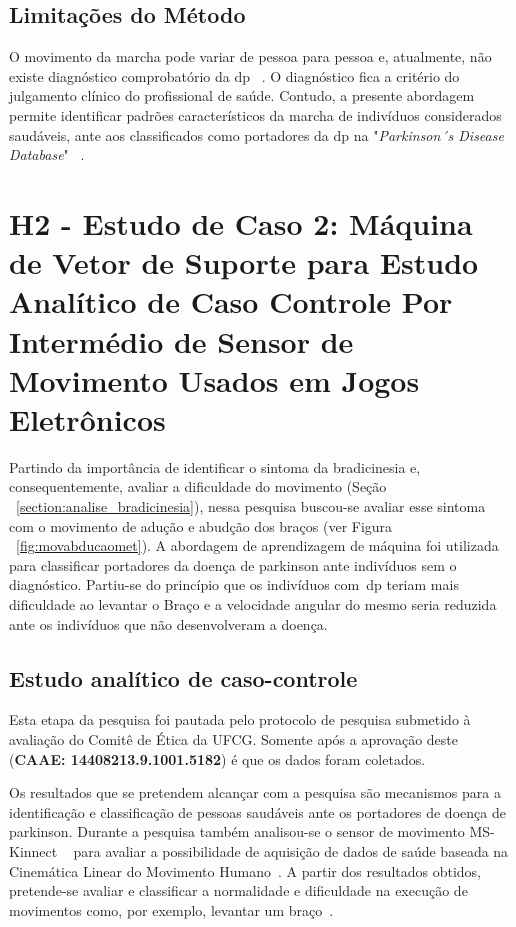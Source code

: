 \subsection{Limitações do Método}
O movimento da marcha pode variar de pessoa para pessoa e, atualmente, não existe diagnóstico comprobatório da \ac{dp} ~\cite{visionbased2009,protpar010}. O diagnóstico fica a critério do julgamento clínico do profissional de saúde. Contudo, a presente abordagem permite identificar padrões característicos da marcha de indivíduos considerados saudáveis, ante aos classificados como portadores da \ac{dp} na "\textit{Parkinson´s Disease Database}" ~\cite{physionet}.


\section{H2 - Estudo de Caso 2: Máquina de Vetor de Suporte para Estudo Analítico de Caso Controle Por Intermédio de Sensor de Movimento Usados em Jogos Eletrônicos}\label{sec:resultado_svm}

Partindo da importância de identificar o sintoma da bradicinesia e, consequentemente, avaliar a dificuldade do movimento (Seção ~\ref{section:analise_bradicinesia}), nessa pesquisa buscou-se avaliar esse sintoma com o movimento de adução e abudção dos braços (ver Figura ~\ref{fig:movabducaomet}). A abordagem de aprendizagem de máquina foi utilizada para classificar portadores da doença de parkinson ante indivíduos sem o diagnóstico. Partiu-se do princípio que os indivíduos com~\ac{dp} teriam mais dificuldade ao levantar o Braço e a velocidade angular do mesmo seria reduzida ante os indivíduos que não desenvolveram a doença.

\subsection{Estudo analítico de caso-controle}\label{section:estudo_caso_controle}
Esta etapa da pesquisa foi pautada pelo protocolo de pesquisa submetido à avaliação do Comitê de Ética da UFCG. Somente após a aprovação deste (\textbf{CAAE: 14408213.9.1001.5182}) é que os dados foram coletados. 

Os resultados que se pretendem alcançar com a pesquisa são mecanismos para a identificação e classificação de pessoas saudáveis ante os portadores de doença de parkinson. Durante a pesquisa também analisou-se o sensor de movimento MS-Kinnect ~\cite{kinnect2013} para avaliar a possibilidade de aquisição de dados de saúde baseada na Cinemática Linear do Movimento Humano~\cite{mcginnis2013biomechanics}. A partir dos resultados obtidos, pretende-se avaliar e classificar a normalidade e dificuldade na execução de movimentos como, por exemplo, levantar um braço~\cite{mcginnis2013biomechanics}.


